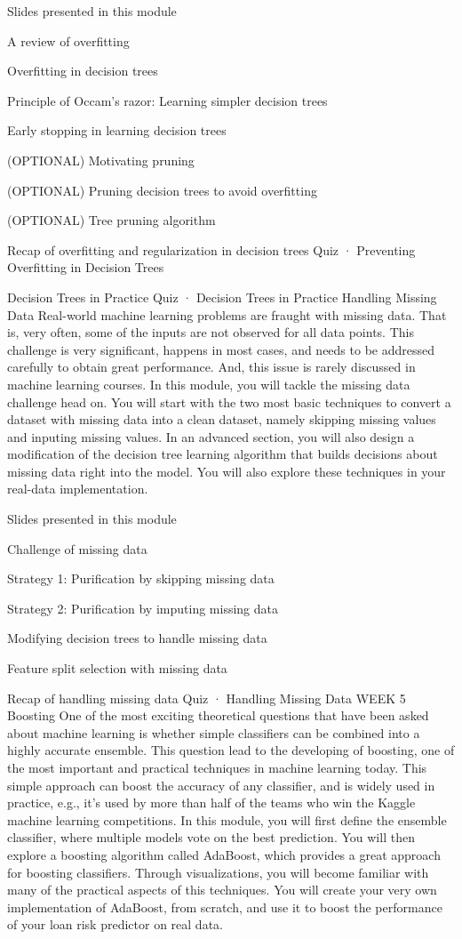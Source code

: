 \item Slides presented in this module
\item A review of overfitting
\item Overfitting in decision trees
\item Principle of Occam's razor: Learning simpler decision trees
\item Early stopping in learning decision trees
\item (OPTIONAL) Motivating pruning
\item (OPTIONAL) Pruning decision trees to avoid overfitting
\item (OPTIONAL) Tree pruning algorithm
\item Recap of overfitting and regularization in decision trees
Quiz · Preventing Overfitting in Decision Trees
\item Decision Trees in Practice
Quiz · Decision Trees in Practice
Handling Missing Data
Real-world machine learning problems are fraught with missing data. That is, very often, some of the inputs are not observed for all data points. This challenge is very significant, happens in most cases, and needs to be addressed carefully to obtain great performance. And, this issue is rarely discussed in machine learning courses. In this module, you will tackle the missing data challenge head on. You will start with the two most basic techniques to convert a dataset with missing data into a clean dataset, namely skipping missing values and inputing missing values. In an advanced section, you will also design a modification of the decision tree learning algorithm that builds decisions about missing data right into the model. You will also explore these techniques in your real-data implementation.
\item Slides presented in this module
\item Challenge of missing data
\item Strategy 1: Purification by skipping missing data
\item Strategy 2: Purification by imputing missing data
\item Modifying decision trees to handle missing data
\item Feature split selection with missing data
\item Recap of handling missing data
Quiz · Handling Missing Data
WEEK 5
Boosting
One of the most exciting theoretical questions that have been asked about machine learning is whether simple classifiers can be combined into a highly accurate ensemble. This question lead to the developing of boosting, one of the most important and practical techniques in machine learning today. This simple approach can boost the accuracy of any classifier, and is widely used in practice, e.g., it's used by more than half of the teams who win the Kaggle machine learning competitions. In this module, you will first define the ensemble classifier, where multiple models vote on the best prediction. You will then explore a boosting algorithm called AdaBoost, which provides a great approach for boosting classifiers. Through visualizations, you will become familiar with many of the practical aspects of this techniques. You will create your very own implementation of AdaBoost, from scratch, and use it to boost the performance of your loan risk predictor on real data.

